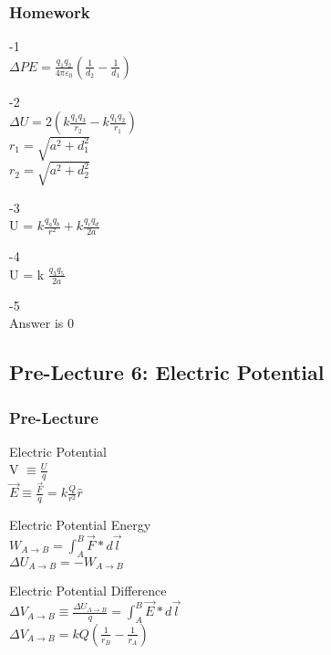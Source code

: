 \documentclass{article}
\begin{document}
\subsubsection{Homework}

-1 \\
$\Delta PE = \frac{q_1 q_2}{4 \pi \varepsilon_0}(\frac{1}{d_2}- \frac{1}{d_1})$

\vspace{2mm}

-2 \\
$\Delta U = 2(k \frac{q_1 q_3}{r_2} - k \frac{q_1 q_2}{r_1})$ \\
$r_1 = \sqrt{a^2 + d^2_1}$ \\
$r_2 = \sqrt{a^2 + d^2_2}$

\vspace{2mm}

-3 \\
U = $k \frac{q_a q_b}{r^2} + k \frac{q_c q_d}{2a}$

\vspace{2mm}

-4 \\
U = k $\frac{q_3 q_5}{2a}$

\vspace{2mm}

-5 \\
Answer is 0
\subsection{Pre-Lecture 6: Electric Potential}

\subsubsection{Pre-Lecture}

\noindent
Electric Potential \\
V $\equiv \frac{U}{q} $ \\
$\vec{E} \equiv \frac{\vec{F}}{q} = k \frac{Q}{r^2}\hat{r}$

\vspace{2mm}

\noindent
Electric Potential Energy \\
$W_{A \rightarrow B} = \int_A^B \vec{F} * d\vec{l} $ \\
$\Delta U_{A \to B} = -W_{A \to B} $

\vspace{2mm}

\noindent
Electric Potential Difference \\
$\Delta V_{A \to B} \equiv \frac{\Delta U_{A \to B}}{q} = \int_{A}^{B} \vec{E} * d\vec{l}$ \\
$\Delta V_{A \to B} = kQ (\frac{1}{r_B} - \frac{1}{r_A})$
\end{document}
